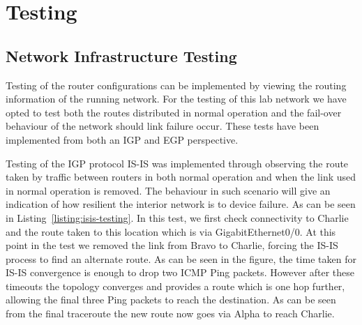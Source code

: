 \chapter{Testing}
\section{Network Infrastructure Testing}
Testing of the router configurations can be implemented by viewing the routing information of the running network. For the testing of this lab network we have opted to test both the routes distributed in normal operation and the fail-over behaviour of the network should link failure occur. These tests have been implemented from both an IGP and EGP perspective.

Testing of the IGP protocol IS-IS was implemented through observing the route taken by traffic between routers in both normal operation and when the link used in normal operation is removed. The behaviour in such scenario will give an indication of how resilient the interior network is to device failure. As can be seen in Listing~\ref{listing:isis-testing}. In this test, we first check connectivity to Charlie and the route taken to this location which is via GigabitEthernet0/0. At this point in the test we removed the link from Bravo to Charlie, forcing the IS-IS process to find an alternate route. As can be seen in the figure, the time taken for IS-IS convergence is enough to drop two ICMP Ping packets. However after these timeouts the topology converges and provides a route which is one hop further, allowing the final three Ping packets to reach the destination. As can be seen from the final traceroute the new route now goes via Alpha to reach Charlie. 

